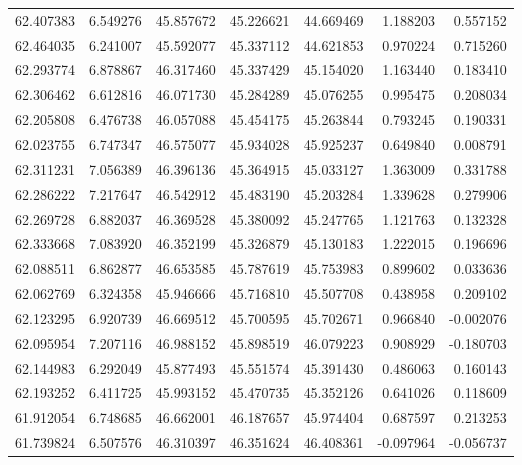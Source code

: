 \begin{tabular}{rrrrrrr}
 62.407383 &   6.549276 &         45.857672 &         45.226621 &         44.669469 &  1.188203 &  0.557152 \\
 62.464035 &   6.241007 &         45.592077 &         45.337112 &         44.621853 &  0.970224 &  0.715260 \\
 62.293774 &   6.878867 &         46.317460 &         45.337429 &         45.154020 &  1.163440 &  0.183410 \\
 62.306462 &   6.612816 &         46.071730 &         45.284289 &         45.076255 &  0.995475 &  0.208034 \\
 62.205808 &   6.476738 &         46.057088 &         45.454175 &         45.263844 &  0.793245 &  0.190331 \\
 62.023755 &   6.747347 &         46.575077 &         45.934028 &         45.925237 &  0.649840 &  0.008791 \\
 62.311231 &   7.056389 &         46.396136 &         45.364915 &         45.033127 &  1.363009 &  0.331788 \\
 62.286222 &   7.217647 &         46.542912 &         45.483190 &         45.203284 &  1.339628 &  0.279906 \\
 62.269728 &   6.882037 &         46.369528 &         45.380092 &         45.247765 &  1.121763 &  0.132328 \\
 62.333668 &   7.083920 &         46.352199 &         45.326879 &         45.130183 &  1.222015 &  0.196696 \\
 62.088511 &   6.862877 &         46.653585 &         45.787619 &         45.753983 &  0.899602 &  0.033636 \\
 62.062769 &   6.324358 &         45.946666 &         45.716810 &         45.507708 &  0.438958 &  0.209102 \\
 62.123295 &   6.920739 &         46.669512 &         45.700595 &         45.702671 &  0.966840 & -0.002076 \\
 62.095954 &   7.207116 &         46.988152 &         45.898519 &         46.079223 &  0.908929 & -0.180703 \\
 62.144983 &   6.292049 &         45.877493 &         45.551574 &         45.391430 &  0.486063 &  0.160143 \\
 62.193252 &   6.411725 &         45.993152 &         45.470735 &         45.352126 &  0.641026 &  0.118609 \\
 61.912054 &   6.748685 &         46.662001 &         46.187657 &         45.974404 &  0.687597 &  0.213253 \\
 61.739824 &   6.507576 &         46.310397 &         46.351624 &         46.408361 & -0.097964 & -0.056737 \\

\end{tabular}
